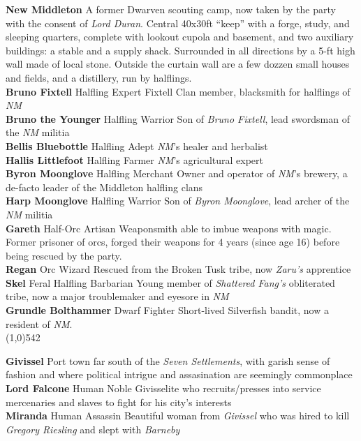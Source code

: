 \documentclass[letterpaper]{article}
\newcommand{\fullline}{\noindent\line(1,0){542} \\}
\newcommand{\person}[3]{\noindent\textbf{#1
    \ifstrequal{#2}{M}{{\color{ProcessBlue}\male}}{%
    \ifstrequal{#2}{F}{\color{VioletRed}\female}{}}}{\scriptsize #3}}
\begin{document}
\noindent\textbf{New Middleton} A former Dwarven scouting camp, now taken by the party with the consent of \emph{Lord Duran}.  Central 40x30ft ``keep'' with a forge, study, and sleeping quarters, complete with lookout cupola and basement, and two auxiliary buildings: a stable and a supply shack. Surrounded in all directions by a 5-ft high wall made of local stone. Outside the curtain wall are a few dozzen small houses and fields, and a distillery, run by halflings. \\
\person{Bruno Fixtell}{M}{Halfling Expert} Fixtell Clan member, blacksmith for halflings of \emph{NM} \\
\person{Bruno the Younger}{M}{Halfling Warrior} Son of \emph{Bruno Fixtell}, lead swordsman of the \emph{NM} militia \\
\person{Bellis Bluebottle}{F}{Halfling Adept} \emph{NM}'s healer and herbalist \\
\person{Hallis Littlefoot}{F}{Halfling Farmer} \emph{NM}'s agricultural expert \\
\person{Byron Moonglove}{M}{Halfling Merchant} Owner and operator of \emph{NM}'s brewery, a de-facto leader of the Middleton halfling clans \\
\person{Harp Moonglove}{M}{Halfling Warrior} Son of \emph{Byron Moonglove}, lead archer of the \emph{NM} militia \\
\person{Gareth}{M}{Half-Orc Artisan} Weaponsmith able to imbue weapons with magic. Former prisoner of orcs, forged their weapons for 4 years (since age 16) before being rescued by the party. \\
\person{Regan}{M}{Orc Wizard} Rescued from the Broken Tusk tribe, now \emph{Zaru's} apprentice \\
\person{Skel}{M}{Feral Halfling Barbarian} Young member of \emph{Shattered Fang's} obliterated tribe, now a major troublemaker and eyesore in \emph{NM} \\
\person{Grundle Bolthammer}{F}{Dwarf Fighter} Short-lived Silverfish bandit, now a resident of \emph{NM}.\\

\vspace{-1.75em}
\fullline
\vspace{-1.5em}

\noindent\textbf{Givissel} Port town far south of the \emph{Seven Settlements}, with garish sense of fashion and where political intrigue and assasination are seemingly commonplace \\
\person{Lord Falcone}{M}{Human Noble} Givisselite who recruits/presses into service mercenaries and slaves to fight for his city's interests\\
\person{Miranda}{F}{Human Assassin} Beautiful woman from \emph{Givissel} who was hired to kill \emph{Gregory Riesling} and slept with \emph{Barneby} \\
\end{document}

